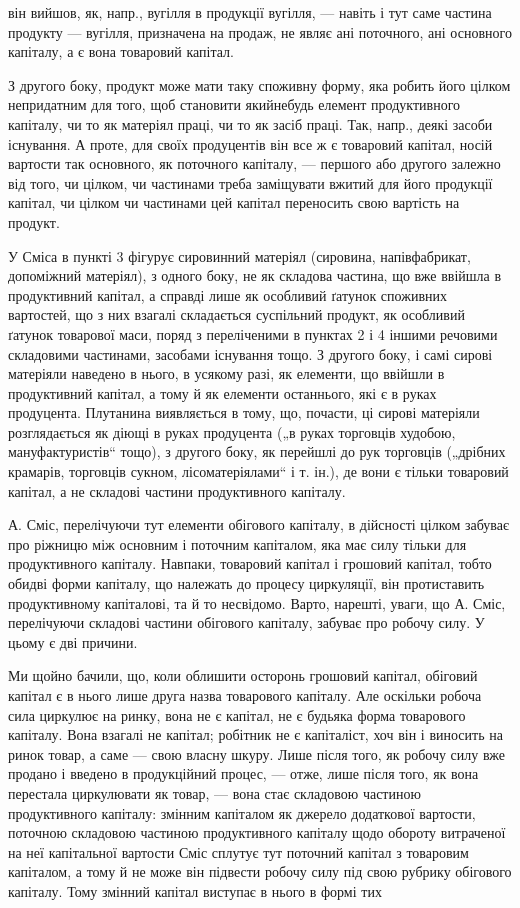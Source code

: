 він вийшов, як, напр., вугілля в продукції вугілля, — навіть і тут саме
частина продукту — вугілля, призначена на продаж, не являє ані поточного,
ані основного капіталу, а є вона товаровий капітал.

З другого боку, продукт може мати таку споживну форму, яка робить
його цілком непридатним для того, щоб становити якийнебудь елемент
продуктивного капіталу, чи то як матеріял праці, чи то як засіб
праці. Так, напр., деякі засоби існування. А проте, для своїх продуцентів
він все ж є товаровий капітал, носій вартости так основного, як поточного
капіталу, — першого або другого залежно від того, чи цілком,
чи частинами треба заміщувати вжитий для його продукції капітал, чи
цілком чи частинами цей капітал переносить свою вартість на продукт.

У Сміса в пункті 3 фігурує сировинний матеріял (сировина, напівфабрикат,
допоміжний матеріял), з одного боку, не як складова частина,
що вже ввійшла в продуктивний капітал, а справді лише як особливий ґатунок
споживних вартостей, що з них взагалі складається суспільний
продукт, як особливий ґатунок товарової маси, поряд з переліченими в
пунктах 2 і 4 іншими речовими складовими частинами, засобами існування
тощо. З другого боку, і самі сирові матеріяли наведено в нього, в
усякому разі, як елементи, що ввійшли в продуктивний капітал, а тому й
як елементи останнього, які є в руках продуцента. Плутанина виявляється в
тому, що, почасти, ці сирові матеріяли розглядається як діющі в руках
продуцента („в руках торговців худобою, мануфактуристів“ тощо), з
другого боку, як перейшлі до рук торговців („дрібних крамарів, торговців
сукном, лісоматеріялами“ і т. ін.), де вони є тільки товаровий капітал, а
не складові частини продуктивного капіталу.

А. Сміс, перелічуючи тут елементи обігового капіталу, в дійсності цілком
забуває про ріжницю між основним і поточним капіталом, яка має
силу тільки для продуктивного капіталу. Навпаки, товаровий капітал і
грошовий капітал, тобто обидві форми капіталу, що належать до процесу
циркуляції, він протиставить продуктивному капіталові, та й то несвідомо.
Варто, нарешті, уваги, що А. Сміс, перелічуючи складові частини обігового
капіталу, забуває про робочу силу. У цьому є дві причини.

Ми щойно бачили, що, коли облишити осторонь грошовий капітал,
обіговий капітал є в нього лише друга назва товарового капіталу. Але
оскільки робоча сила циркулює на ринку, вона не є капітал, не є будьяка
форма товарового капіталу. Вона взагалі не капітал; робітник не є
капіталіст, хоч він і виносить на ринок товар, а саме — свою власну шкуру.
Лише після того, як робочу силу вже продано і введено в продукційний
процес, — отже, лише після того, як вона перестала циркулювати
як товар, — вона стає складовою частиною продуктивного капіталу: змінним
капіталом як джерело додаткової вартости, поточною складовою
частиною продуктивного капіталу щодо обороту витраченої на неї капітальної
вартости Сміс сплутує тут поточний капітал з товаровим капіталом,
а тому й не може він підвести робочу силу під свою рубрику обігового
капіталу. Тому змінний капітал виступає в нього в формі тих
